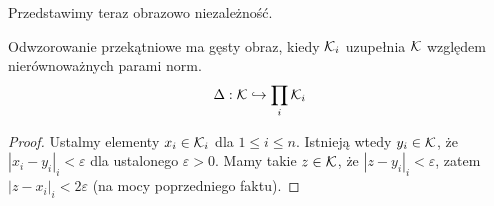 Przedstawimy teraz obrazowo niezależność.

\begin{fakt}
	Odwzorowanie przekątniowe ma gęsty obraz, kiedy $\mathcal K_i$ uzupełnia $\mathcal K$ względem nierównoważnych parami norm.
	\[
		\Delta: \mathcal K \hookrightarrow \prod_i \mathcal K_i
	\]
\end{fakt}

\begin{proof}
	Ustalmy elementy $x_i \in \mathcal K_i$ dla $1 \le i \le n$.
	Istnieją wtedy $y_i \in \mathcal K$, że $|x_i-y_i|_i < \varepsilon$ dla ustalonego $\varepsilon > 0$.
	Mamy takie $z \in \mathcal K$, że $|z - y_i|_i < \varepsilon$, zatem $|z - x_i|_i < 2 \varepsilon$ (na mocy poprzedniego faktu).
\end{proof}